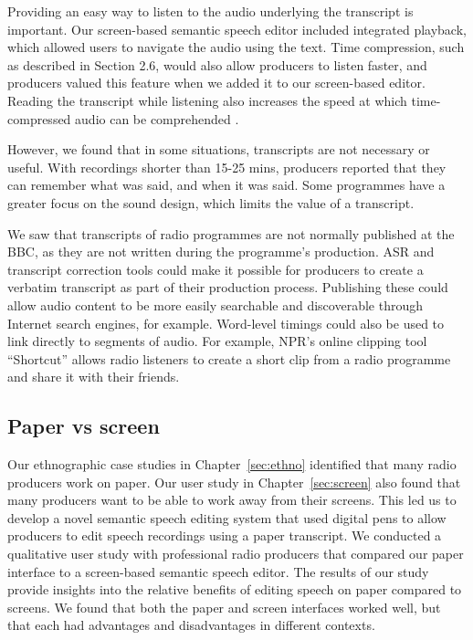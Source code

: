 
Providing an easy way to listen to the audio underlying the transcript is important. Our screen-based semantic speech
editor included integrated playback, which allowed users to navigate the audio using the text.  Time compression, such
as described in Section 2.6, would also allow producers to listen faster, and producers valued this feature when we
added it to our screen-based editor. Reading the transcript while listening also increases the
speed at which time-compressed audio can be comprehended \citep{Vemuri2004}.

However, we found that in some situations, transcripts are not necessary or useful. With recordings shorter than 15-25
mins, producers reported that they can remember what was said, and when it was said. Some programmes have a greater
focus on the sound design, which limits the value of a transcript.



We saw that transcripts of radio programmes are not normally published at the BBC, as they are not written during the
programme's production. ASR and transcript correction tools could make it possible for producers to create a verbatim
transcript as part of their production process.  Publishing these could allow audio content to be more easily
searchable and discoverable through Internet search engines, for example.  Word-level timings could also be used to
link directly to segments of audio. For example, NPR's online clipping tool ``Shortcut'' \citep{Friedhoff2016} allows
radio listeners to create a short clip from a radio programme and share it with their friends. 

\subsection{Paper vs screen}

Our ethnographic case studies in Chapter~\ref{sec:ethno} identified that many radio producers work on paper.
Our user study in Chapter~\ref{sec:screen} also found that many producers want to be able to work away from their
screens.  This led us to develop a novel semantic speech editing system that used digital pens to allow producers to
edit speech recordings using a paper transcript.  We conducted a qualitative user study with professional radio producers
that compared our paper interface to a screen-based semantic speech editor. The results of our study provide insights
into the relative benefits of editing speech on paper compared to screens. We found that both the paper and screen
interfaces worked well, but that each had advantages and disadvantages in different contexts.

